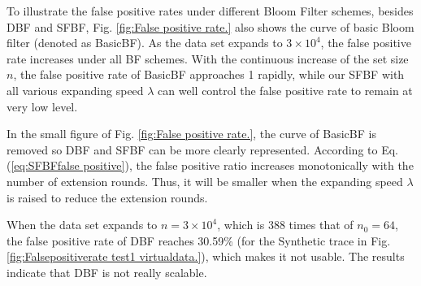 \documentclass[10pt,journal,compsoc]{IEEEtran}
\begin{document}
To illustrate the false positive rates under different Bloom Filter schemes, besides DBF and SFBF, Fig. \ref{fig:False positive rate.} also shows the curve of basic Bloom filter (denoted as BasicBF). As the data set expands to $3 \times 10^4$, the false positive rate increases under all BF schemes. With the continuous increase of the set size $n$, the false positive rate of BasicBF approaches 1 rapidly, while our SFBF with all various expanding speed $\lambda$ can well control the false positive rate to remain at very low level.

In the small figure of Fig. \ref{fig:False positive rate.}, the curve of BasicBF is removed so DBF and SFBF can be more clearly represented. According to Eq. (\ref{eq:SFBFfalse positive}), the false positive ratio increases monotonically with the number of extension rounds. Thus, it will be smaller when the expanding speed $\lambda$ is raised to reduce the extension rounds.




When the data set expands to $n = 3 \times 10^4$, which is 388 times that of $n_0= 64$, the false positive rate of DBF reaches 30.59\% (for the Synthetic trace in Fig. \ref{fig:Falsepositiverate test1 virtualdata.}),
   which makes it not usable. The results indicate that DBF is not really scalable.
\end{document}
